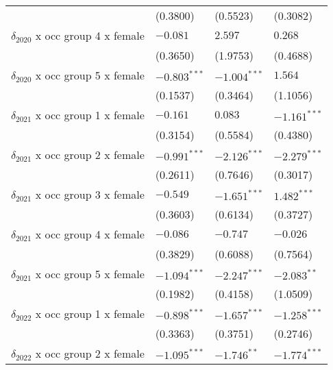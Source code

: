 \begin{tabular}{llll}
                                       &           (0.3800) &           (0.5523) &           (0.3082) \\
$\delta_{2020}$ x occ group 4 x female &           $-0.081$ &            $2.597$ &            $0.268$ \\
                                       &           (0.3650) &           (1.9753) &           (0.4688) \\
$\delta_{2020}$ x occ group 5 x female &     $-0.803^{***}$ &     $-1.004^{***}$ &            $1.564$ \\
                                       &           (0.1537) &           (0.3464) &           (1.1056) \\
$\delta_{2021}$ x occ group 1 x female &           $-0.161$ &            $0.083$ &     $-1.161^{***}$ \\
                                       &           (0.3154) &           (0.5584) &           (0.4380) \\
$\delta_{2021}$ x occ group 2 x female &     $-0.991^{***}$ &     $-2.126^{***}$ &     $-2.279^{***}$ \\
                                       &           (0.2611) &           (0.7646) &           (0.3017) \\
$\delta_{2021}$ x occ group 3 x female &           $-0.549$ &     $-1.651^{***}$ &      $1.482^{***}$ \\
                                       &           (0.3603) &           (0.6134) &           (0.3727) \\
$\delta_{2021}$ x occ group 4 x female &           $-0.086$ &           $-0.747$ &           $-0.026$ \\
                                       &           (0.3829) &           (0.6088) &           (0.7564) \\
$\delta_{2021}$ x occ group 5 x female &     $-1.094^{***}$ &     $-2.247^{***}$ &      $-2.083^{**}$ \\
                                       &           (0.1982) &           (0.4158) &           (1.0509) \\
$\delta_{2022}$ x occ group 1 x female &     $-0.898^{***}$ &     $-1.657^{***}$ &     $-1.258^{***}$ \\
                                       &           (0.3363) &           (0.3751) &           (0.2746) \\
$\delta_{2022}$ x occ group 2 x female &     $-1.095^{***}$ &      $-1.746^{**}$ &     $-1.774^{***}$ \\

\end{tabular}
